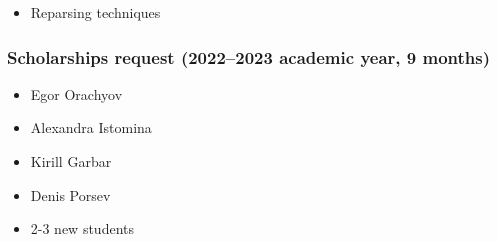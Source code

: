 \documentclass[xcolor=table,aspectratio=169]{beamer}
\begin{document}
\begin{frame}[fragile]
\begin{minipage}[t]{0.48\textwidth}
\begin{itemize}
      \item Reparsing techniques
    \end{itemize}
  \end{minipage}
\end{frame}

\begin{frame}[fragile]
    \frametitle{Scholarships request (2022--2023 academic year, 9 months)}
      \begin{itemize}
        \item Egor Orachyov
        \item Alexandra Istomina
        \item Kirill Garbar
        \item Denis Porsev
        \item 2-3 new students 
      \end{itemize}
  \end{frame}
\end{document}

